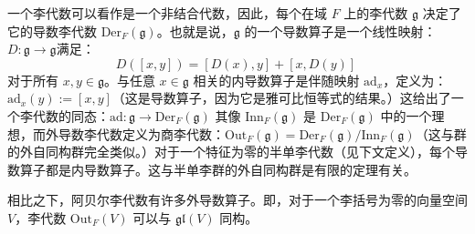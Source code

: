 一个李代数可以看作是一个非结合代数，因此，每个在域 \( F \) 上的李代数 \( \mathfrak{g} \) 决定了它的导数李代数 \( \text{Der}_F(\mathfrak{g}) \)。也就是说，\( \mathfrak{g} \) 的一个导数算子是一个线性映射：\(D \colon \mathfrak{g} \to \mathfrak{g}\)满足：
\[
D([x,y]) = [D(x),y] + [x,D(y)]~
\]
对于所有 \( x, y \in \mathfrak{g} \)。与任意 \( x \in \mathfrak{g} \) 相关的内导数算子是伴随映射 \( \mathrm{ad}_x \)，定义为：\(\mathrm{ad}_x(y) := [x, y]\)（这是导数算子，因为它是雅可比恒等式的结果。）这给出了一个李代数的同态：\(\mathrm{ad} \colon \mathfrak{g} \to \text{Der}_F(\mathfrak{g})\)
其像 \( \text{Inn}_F(\mathfrak{g}) \) 是 \( \text{Der}_F(\mathfrak{g}) \) 中的一个理想，而外导数李代数定义为商李代数：\(\text{Out}_F(\mathfrak{g}) = \text{Der}_F(\mathfrak{g}) / \text{Inn}_F(\mathfrak{g})\)（这与群的外自同构群完全类似。）对于一个特征为零的半单李代数（见下文定义），每个导数算子都是内导数算子。这与半单李群的外自同构群是有限的定理有关。

相比之下，阿贝尔李代数有许多外导数算子。即，对于一个李括号为零的向量空间 \( V \)，李代数 \( \text{Out}_F(V) \) 可以与 \( \mathfrak{gl}(V) \) 同构。